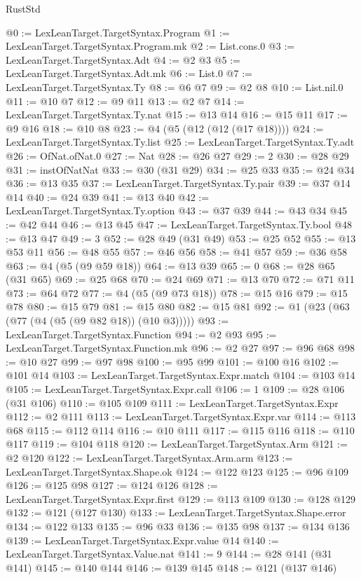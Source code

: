 \begin{lexlean}{RustStd}
\begin{coremodule}
{\begin{coremodule}
{{{{{{{{{{{{{{{{{{{{{{{{{{{{{{{{{{{{{{{{{{{{@0 := LexLeanTarget.TargetSyntax.Program
@1 := LexLeanTarget.TargetSyntax.Program.mk
@2 := List.cons.{0}
@3 := LexLeanTarget.TargetSyntax.Adt
@4 := @2 @3
@5 := LexLeanTarget.TargetSyntax.Adt.mk
@6 := List.{0}
@7 := LexLeanTarget.TargetSyntax.Ty
@8 := @6 @7
@9 := @2 @8
@10 := List.nil.{0}
@11 := @10 @7
@12 := @9 @11
@13 := @2 @7
@14 := LexLeanTarget.TargetSyntax.Ty.nat
@15 := @13 @14
@16 := @15 @11
@17 := @9 @16
@18 := @10 @8
@23 := @4 (@5 (@12 (@12 (@17 @18))))
@24 := LexLeanTarget.TargetSyntax.Ty.list
@25 := LexLeanTarget.TargetSyntax.Ty.adt
@26 := OfNat.ofNat.{0}
@27 := Nat
@28 := @26 @27
@29 := 2
@30 := @28 @29
@31 := instOfNatNat
@33 := @30 (@31 @29)
@34 := @25 @33
@35 := @24 @34
@36 := @13 @35
@37 := LexLeanTarget.TargetSyntax.Ty.pair
@39 := @37 @14 @14
@40 := @24 @39
@41 := @13 @40
@42 := LexLeanTarget.TargetSyntax.Ty.option
@43 := @37 @39
@44 := @43 @34
@45 := @42 @44
@46 := @13 @45
@47 := LexLeanTarget.TargetSyntax.Ty.bool
@48 := @13 @47
@49 := 3
@52 := @28 @49 (@31 @49)
@53 := @25 @52
@55 := @13 @53 @11
@56 := @48 @55
@57 := @46 @56
@58 := @41 @57
@59 := @36 @58
@63 := @4 (@5 (@9 @59 @18))
@64 := @13 @39
@65 := 0
@68 := @28 @65 (@31 @65)
@69 := @25 @68
@70 := @24 @69
@71 := @13 @70
@72 := @71 @11
@73 := @64 @72
@77 := @4 (@5 (@9 @73 @18))
@78 := @15 @16
@79 := @15 @78
@80 := @15 @79
@81 := @15 @80
@82 := @15 @81
@92 := @1 (@23 (@63 (@77 (@4 (@5 (@9 @82 @18)) (@10 @3)))))
@93 := LexLeanTarget.TargetSyntax.Function
@94 := @2 @93
@95 := LexLeanTarget.TargetSyntax.Function.mk
@96 := @2 @27
@97 := @96 @68
@98 := @10 @27
@99 := @97 @98
@100 := @95 @99
@101 := @100 @16
@102 := @101 @14
@103 := LexLeanTarget.TargetSyntax.Expr.match
@104 := @103 @14
@105 := LexLeanTarget.TargetSyntax.Expr.call
@106 := 1
@109 := @28 @106 (@31 @106)
@110 := @105 @109
@111 := LexLeanTarget.TargetSyntax.Expr
@112 := @2 @111
@113 := LexLeanTarget.TargetSyntax.Expr.var
@114 := @113 @68
@115 := @112 @114
@116 := @10 @111
@117 := @115 @116
@118 := @110 @117
@119 := @104 @118
@120 := LexLeanTarget.TargetSyntax.Arm
@121 := @2 @120
@122 := LexLeanTarget.TargetSyntax.Arm.arm
@123 := LexLeanTarget.TargetSyntax.Shape.ok
@124 := @122 @123
@125 := @96 @109
@126 := @125 @98
@127 := @124 @126
@128 := LexLeanTarget.TargetSyntax.Expr.first
@129 := @113 @109
@130 := @128 @129
@132 := @121 (@127 @130)
@133 := LexLeanTarget.TargetSyntax.Shape.error
@134 := @122 @133
@135 := @96 @33
@136 := @135 @98
@137 := @134 @136
@139 := LexLeanTarget.TargetSyntax.Expr.value @14
@140 := LexLeanTarget.TargetSyntax.Value.nat
@141 := 9
@144 := @28 @141 (@31 @141)
@145 := @140 @144
@146 := @139 @145
@148 := @121 (@137 @146)
}}}}}}}}}}}}}}}}}}}}}}}}}}}}}}}}}}}}}}}}}}}}
\end{coremodule}}
\end{coremodule}
\end{lexlean}
